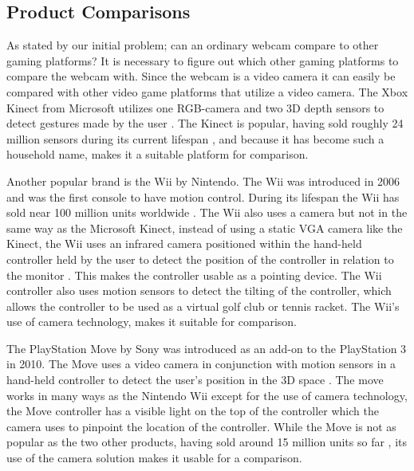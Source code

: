 \subsection{Product Comparisons}
As stated by our initial problem; can an ordinary webcam compare to other gaming platforms? It is necessary to figure out which other gaming platforms to compare the webcam with. Since the webcam is a video camera it can easily be compared with other video game platforms that utilize a video camera. The Xbox Kinect from Microsoft utilizes one RGB-camera and two 3D depth sensors to detect gestures made by the user \parencite{Cong}. The Kinect is popular, having sold roughly 24 million sensors during its current lifespan \parencite{MSByNumbers}, and because it has become such a household name, makes it a suitable platform for comparison.
\bigskip

Another popular brand is the Wii by Nintendo. The Wii was introduced in 2006 and was the first console to have motion control. During its lifespan the Wii has sold near 100 million units worldwide \parencite{NintendoSales}. The Wii also uses a camera but not in the same way as the Microsoft Kinect, instead of using a static VGA camera like the Kinect, the Wii uses an infrared camera positioned within the hand-held controller held by the user to detect the position of the controller in relation to the monitor \parencite{Castaneda2006}. This makes the controller usable as a pointing device. The Wii controller also uses motion sensors to detect the tilting of the controller, which allows the controller to be used as a virtual golf club or tennis racket. The Wii's use of camera technology, makes it suitable for comparison.
\bigskip

The PlayStation Move by Sony was introduced as an add-on to the PlayStation 3 in 2010. The Move uses a video camera in conjunction with motion sensors in a hand-held controller to detect the user's position in the 3D space \parencite{Kumar2009}. The move works in many ways as the Nintendo Wii except for the use of camera technology, the Move controller has a visible light on the top of the controller which the camera uses to pinpoint the location of the controller. While the Move is not as popular as the two other products, having sold around 15 million units so far \parencite{Yin-Poole2012}, its use of the camera solution makes it usable for a comparison.
